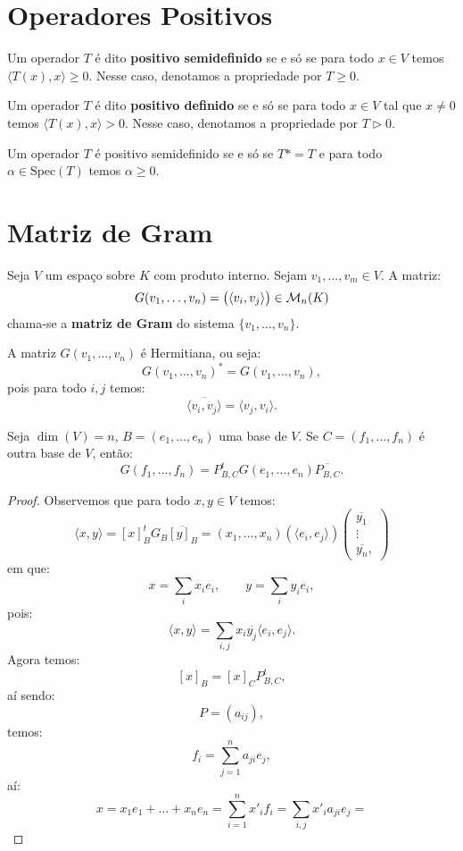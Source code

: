 \documentclass[11pt,twoside,a4paper]{book}
\begin{document}
\section{Operadores Positivos}

\begin{definicao}
Um operador $T$ é dito \textbf{positivo semidefinido} se e só se para todo $x\in V$ temos $\langle T(x),x\rangle\geq 0.$ Nesse caso, denotamos a propriedade por $T\geq 0.$
\end{definicao}

\begin{definicao}
Um operador $T$ é dito \textbf{positivo definido} se e só se para todo $x\in V$ tal que $x\neq 0$ temos $\langle T(x),x\rangle>0.$ Nesse caso, denotamos a propriedade por $T\rhd 0.$
\end{definicao}

\begin{teorema}
Um operador $T$ é positivo semidefinido se e só se $T*=T$ e para todo $\alpha\in\mathrm{Spec}(T)$ temos $\alpha\geq 0.$
\end{teorema}

\section{Matriz de Gram}

\begin{definicao}
Seja $V$ um espaço sobre $K$ com produto interno. Sejam $v_1,\dots,v_m\in V$. A matriz:
\[
G(v_1,\dots,v_n)=\left(\langle v_i,v_j\rangle\right)\in\mathcal{M}_{n}(K)
\]
chama-se a \textbf{matriz de Gram} do sistema $\{v_1,\dots,v_n\}$.
\end{definicao}

\noindent
A matriz $G(v_1,\dots,v_n)$ é Hermitiana, ou seja:
\[
G(v_1,\dots,v_n)^*=G(v_1,\dots,v_n),
\]
pois para todo $i,j$ temos:
\[
\overline{\langle v_i,v_j\rangle}=\langle v_j,v_i\rangle.
\]

\begin{proposicao}
Seja $\dim(V)=n$, $B=(e_1,\dots,e_n)$ uma base de $V$. Se $C=(f_1,\dots,f_n)$ é outra base de $V$, então:
\[
G(f_1,\dots,f_n)=P^t_{B,C}G(e_1,\dots,e_n)\overline{P_{B,C}}.
\]
\end{proposicao}
\begin{proof}
Observemos que para todo $x,y\in V$ temos:
\[
\langle x,y\rangle=[x]^t_BG_B\overline{[y]_B}=(x_1,\dots,x_n)\left(\langle e_i,e_j\rangle\right)\begin{pmatrix}
\overline{y_1}\\\vdots\\\overline{y_n},
\end{pmatrix}
\]
em que:
\[
x=\sum_i x_ie_i,\quad\quad y=\sum_i y_ie_i,
\]
pois:
\[
\langle x,y\rangle=\sum_{i,j}x_i\overline{y_j}\langle e_i,e_j\rangle.
\]
Agora temos:
\[
[x]_B=[x]_CP_{B,C}^t,
\]
aí sendo:
\[
P=(a_{ij}),
\]
temos:
\[
f_i=\sum_{j=1}^na_{ji}e_j,
\]
aí:
\[
x=x_1e_1+\dots+x_ne_n=\sum_{i=1}^nx'_if_i=\sum_{i,j}x'_ia_{ji}e_j=
\]
\end{proof}
\end{document}
